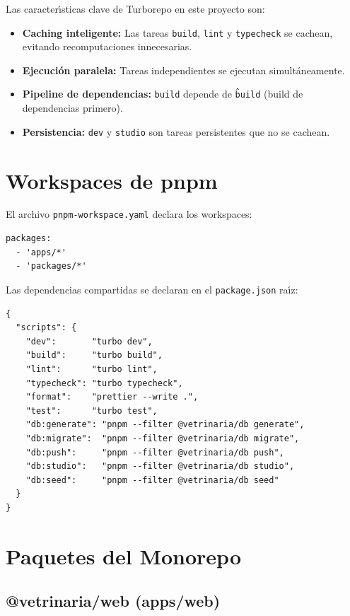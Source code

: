 Las caracter\'{\i}sticas clave de Turborepo en este proyecto son:

\begin{itemize}[leftmargin=*]
    \item \textbf{Caching inteligente:} Las tareas \texttt{build}, \texttt{lint}
          y \texttt{typecheck} se cachean, evitando recomputaciones innecesarias.
    \item \textbf{Ejecuci\'on paralela:} Tareas independientes se ejecutan
          simult\'aneamente.
    \item \textbf{Pipeline de dependencias:} \texttt{build} depende de
          \texttt{\^build} (build de dependencias primero).
    \item \textbf{Persistencia:} \texttt{dev} y \texttt{studio} son tareas
          persistentes que no se cachean.
\end{itemize}

\section{Workspaces de pnpm}

El archivo \texttt{pnpm-workspace.yaml} declara los workspaces:

\begin{lstlisting}[style=yaml, caption=pnpm-workspace.yaml]
packages:
  - 'apps/*'
  - 'packages/*'
\end{lstlisting}

Las dependencias compartidas se declaran en el \texttt{package.json} ra\'{\i}z:

\begin{lstlisting}[style=json, caption=package.json raiz (scripts)]
{
  "scripts": {
    "dev":       "turbo dev",
    "build":     "turbo build",
    "lint":      "turbo lint",
    "typecheck": "turbo typecheck",
    "format":    "prettier --write .",
    "test":      "turbo test",
    "db:generate": "pnpm --filter @vetrinaria/db generate",
    "db:migrate":  "pnpm --filter @vetrinaria/db migrate",
    "db:push":     "pnpm --filter @vetrinaria/db push",
    "db:studio":   "pnpm --filter @vetrinaria/db studio",
    "db:seed":     "pnpm --filter @vetrinaria/db seed"
  }
}
\end{lstlisting}

\section{Paquetes del Monorepo}

\subsection{@vetrinaria/web (apps/web)}

